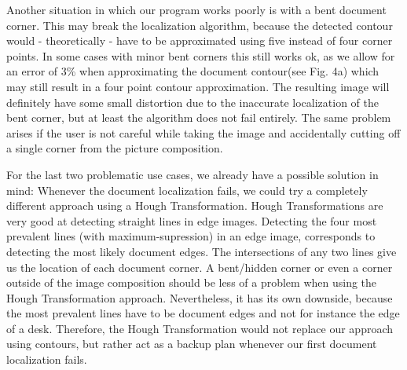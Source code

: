 \documentclass[bibliography=totoc]{scrartcl}
\begin{document}
	Another situation in which our program works poorly is with a bent document corner. 
	This may break the localization algorithm, because the detected contour would - theoretically - have to be approximated using five instead of four corner points.
	In some cases with minor bent corners this still works ok, as we allow for an error of 3\% when approximating the document contour(see Fig. 4a) which may still result in a four point contour approximation. 
	The resulting image will definitely have some small distortion due to the inaccurate localization of the bent corner, but at least the algorithm does not fail entirely.
	The same problem arises if the user is not careful while taking the image and accidentally cutting off a single corner from the picture composition.
	
	For the last two problematic use cases, we already have a possible solution in mind: 
	Whenever the document localization fails, we could try a completely different approach using a Hough Transformation. 
	Hough Transformations are very good at detecting straight lines in edge images. 
	Detecting the four most prevalent lines (with maximum-supression) in an edge image, corresponds to detecting the most likely document edges.
	The intersections of any two lines give us the location of each document corner. 
	A bent/hidden corner or even a corner outside of the image composition should be less of a problem when using the Hough Transformation approach.
	Nevertheless, it has its own downside, because the most prevalent lines have to be document edges and not for instance the edge of a desk.
	Therefore, the Hough Transformation would not replace our approach using contours, but rather act as a backup plan whenever our first document localization fails.
	
\end{document}
